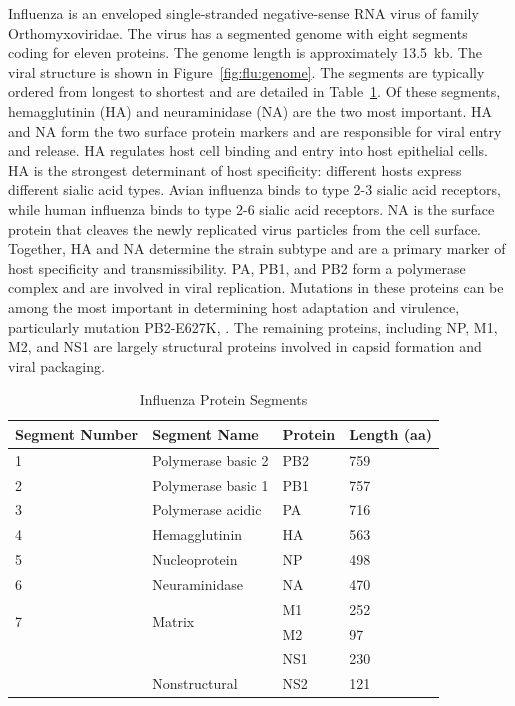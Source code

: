 Influenza is an enveloped single-stranded negative-sense RNA virus of family Orthomyxoviridae.
The virus has a segmented genome with eight segments coding for eleven proteins.
The genome length is approximately 13.5~kb.
The viral structure is shown in Figure~\ref{fig:flu:genome}.
The segments are typically ordered from longest to shortest and are detailed in Table~\ref{table:influenza_genome_segments}.
Of these segments, hemagglutinin (HA) and neuraminidase (NA) are the two most important.
HA and NA form the two surface protein markers and are responsible for viral entry and release.
HA regulates host cell binding and entry into host epithelial cells.
HA is the strongest determinant of host specificity: different hosts express different sialic acid types.
Avian influenza binds to type 2-3 sialic acid receptors, while human influenza binds to type 2-6 sialic acid receptors.
NA is the surface protein that cleaves the newly replicated virus particles from the cell surface.
Together, HA and NA determine the strain subtype and are a primary marker of host specificity and transmissibility.
PA, PB1, and PB2 form a polymerase complex and are involved in viral replication.
Mutations in these proteins can be among the most important in determining host adaptation and virulence, particularly mutation PB2-E627K, \cite{Subbarao:1993tt,Hatta:2001cw}. 
The remaining proteins, including NP, M1, M2, and NS1 are largely structural proteins involved in capsid formation and viral packaging.

\begin{table}
\centering
\caption{Influenza Protein Segments}
\small
\setlength{\aboverulesep}{0pt}
\setlength{\belowrulesep}{0pt}
\setlength{\extrarowheight}{.75ex}
\begin{tabularx}{\textwidth}{XXXX}
\toprule\rowcolor{gray!50}
Segment Number & Segment Name & Protein & Length (aa) \\
\midrule
                   1 & Polymerase basic 2 & PB2 & 759 \\
\rowcolor{gray!25} 2 & Polymerase basic 1 & PB1 & 757 \\
                   3 & Polymerase acidic  & PA  & 716 \\
\rowcolor{gray!25} 4 & Hemagglutinin      & HA  & 563 \\
                   5 & Nucleoprotein      & NP  & 498\\
\rowcolor{gray!25} 6 & Neuraminidase      & NA  & 470\\
\multirow{2}{*}{7} & \multirow{2}{*}{Matrix}  & M1  & 252 \\
				   &                          & M2  & 97 \\
\rowcolor{gray!25}                      &                                 & NS1 & 230 \\
\rowcolor{gray!25} \multirow{-2}{*}{8}  & \multirow{-2}{*}{Nonstructural} & NS2 & 121 \\
\bottomrule
\end{tabularx}
\label{table:influenza_genome_segments}
\end{table}

